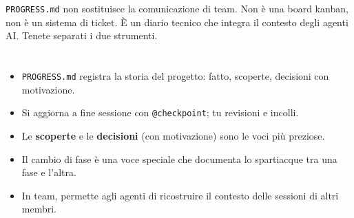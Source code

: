 \begin{warnbox}
\texttt{PROGRESS.md} non sostituisce la comunicazione di team. Non è una board kanban, non è un sistema di ticket. È un diario tecnico che integra il contesto degli agenti AI. Tenete separati i due strumenti.
\end{warnbox}

\section*{\LabelSummary}

\begin{itemize}
  \item \texttt{PROGRESS.md} registra la storia del progetto: fatto, scoperte, decisioni con motivazione.
  \item Si aggiorna a fine sessione con \texttt{@checkpoint}; tu revisioni e incolli.
  \item Le \textbf{scoperte} e le \textbf{decisioni} (con motivazione) sono le voci più preziose.
  \item Il cambio di fase è una voce speciale che documenta lo spartiacque tra una fase e l'altra.
  \item In team, permette agli agenti di ricostruire il contesto delle sessioni di altri membri.
\end{itemize}
